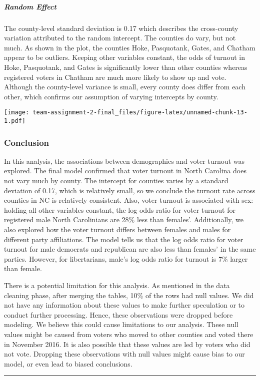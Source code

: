 \documentclass[
]{article}
\begin{document}
\hypertarget{random-effect}{%
\subparagraph{Random Effect}\label{random-effect}}

The county-level standard deviation is 0.17 which describes the
cross-county variation attributed to the random intercept. The counties
do vary, but not much. As shown in the plot, the counties Hoke,
Pasquotank, Gates, and Chatham appear to be outliers. Keeping other
variables constant, the odds of turnout in Hoke, Pasquotank, and Gates
is significantly lower than other counties whereas registered voters in
Chatham are much more likely to show up and vote. Although the
county-level variance is small, every county does differ from each
other, which confirms our assumption of varying intercepts by county.

\texttt{[image: team-assignment-2-final\_files/figure-latex/unnamed-chunk-13-1.pdf]}

\hypertarget{conclusion-1}{%
\subsubsection{Conclusion}\label{conclusion-1}}

In this analysis, the associations between demographics and voter
turnout was explored. The final model confirmed that voter turnout in
North Carolina does not vary much by county. The intercept for counties
varies by a standard deviation of 0.17, which is relatively small, so we
conclude the turnout rate across counties in NC is relatively
consistent. Also, voter turnout is associated with sex: holding all
other variables constant, the log odds ratio for voter turnout for
registered male North Carolinians are 28\% less than females'.
Additionally, we also explored how the voter turnout differs between
females and males for different party affiliations. The model tells us
that the log odds ratio for voter turnout for male democrats and
republican are also less than females' in the same parties. However, for
libertarians, male's log odds ratio for turnout is 7\% larger than
female.

There is a potential limitation for this analysis. As mentioned in the
data cleaning phase, after merging the tables, 10\% of the rows had null
values. We did not have any information about these values to make
further speculation or to conduct further processing. Hence, these
observations were dropped before modeling. We believe this could cause
limitations to our analysis. These null values might be caused from
voters who moved to other counties and voted there in November 2016. It
is also possible that these values are led by voters who did not vote.
Dropping these observations with null values might cause bias to our
model, or even lead to biased conclusions.

\begin{center}\rule{0.5\linewidth}{0.5pt}\end{center}
\end{document}
